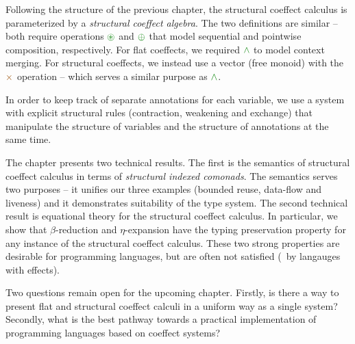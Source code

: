 Following the structure of the previous chapter, the structural coeffect calculus is parameterized
by a \emph{structural coeffect algebra}. The two definitions are similar -- both require operations 
$\cseq$ and $\cpar$ that model sequential and pointwise composition, respectively. For flat 
coeffects, we required $\czip$ to model context merging. For structural coeffects, we 
instead use a vector (free monoid) with the $\atimes$ operation -- which serves a similar purpose
as $\czip$.

In order to keep track of separate annotations for each variable, we use a system with 
explicit structural rules (contraction, weakening and exchange) that manipulate the structure
of variables and the structure of annotations at the same time.

The chapter presents two technical results. The first is the semantics of structural coeffect
calculus in terms of \emph{structural indexed comonads}. The semantics serves two purposes --
it unifies our three examples (bounded reuse, data-flow and liveness) and it demonstrates
suitability of the type system. The second technical result is equational theory for the structural
coeffect calculus. In particular, we show that $\beta$-reduction and $\eta$-expansion have the
typing preservation property for any instance of the structural coeffect calculus. These two 
strong properties are desirable for programming languages, but are often not satisfied 
(\eg~by langauges with effects).

Two questions remain open for the upcoming chapter. Firstly, is there a way to present 
flat and structural coeffect calculi in a uniform way as a single system? Secondly, what
is the best pathway towards a practical implementation of programming languages based on 
coeffect systems?